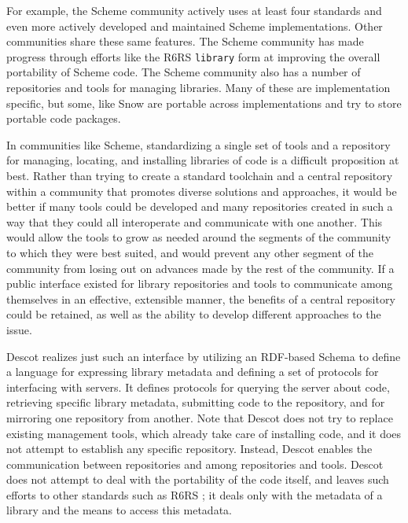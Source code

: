 \documentclass[9pt,cm,twocolumn,preprint]{sigplanconf}
\begin{document}
For example, the Scheme community actively uses 
at least four standards
\cite{ieee-scheme,r4rs,r5rs,r6rs} 
and even more actively developed and maintained Scheme implementations. 
Other communities share these same features. 
The Scheme community has made progress through efforts like 
the R6RS \cite{r6rs} {\tt library} form at improving the overall
portability of Scheme code. 
The Scheme community also has a number of repositories and tools 
for managing libraries. 
Many of these are implementation specific, but some, like Snow 
\cite{snow} are portable across implementations and try to 
store portable code packages. 

In communities like Scheme, standardizing a single set of tools 
and a repository for managing, locating, and installing libraries of 
code is a difficult proposition at best. 
Rather than trying to create a standard toolchain and a central
repository within a community that promotes diverse solutions and
approaches, it would be better if many tools could be developed 
and many repositories created in such a way that they could all 
interoperate and communicate with one another. 
This would allow the tools to grow as needed around the segments 
of the community to which they were best suited, and would prevent 
any other segment of the community from losing out on advances 
made by the rest of the community. 
If a public interface existed for library repositories and 
tools to communicate among themselves in an effective, extensible 
manner, the benefits of a central repository could be retained, 
as well as the ability to develop different approaches to the issue. 

Descot \cite{descot} realizes just such an interface 
by utilizing an RDF-based Schema 
\cite{rdf,rdfprimer} 
to define a language for expressing library metadata and 
defining a set of protocols for interfacing with servers. 
It defines protocols for querying the server about code, 
retrieving specific library metadata, submitting code to the 
repository, and for mirroring one repository from another. 
Note that Descot does not try to replace 
existing management tools, which already take care of 
installing code, and it does not attempt to establish 
any specific repository. 
Instead, Descot enables the communication between repositories 
and among repositories and tools.
Descot does not attempt to deal with the portability of 
the code itself, and leaves such efforts to other standards 
such as R6RS \cite{r6rs}; it deals only with the metadata of a library 
and the means to access this metadata. 
\end{document}
